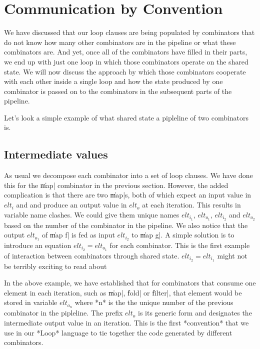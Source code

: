 \documentclass[preamble.tex]{subfiles}
\begin{document}
\section{Communication by Convention}

We have discussed that our loop clauses are being populated by combinators that do not know how many other combinators are in the pipeline or what these combinators are. And yet, once all of the combinators have filled in their parts, we end up with just one loop in which those combinators operate on the shared state. We will now discuss the approach by which those combinators cooperate with each other inside a single loop and how the state produced by one combinator is passed on to the combinators in the subsequent parts of the pipeline.

Let's look a simple example of what shared state a pipleline of two combinators  is.


\subsection{\label{sec:Loop:Elts}Intermediate values}

As usual we decompose each combinator into a set of loop clauses. We have done this for the \|map| combinator in the previous section. However, the added complication is that there are two \|map|s, both of which expect an input value in $elt_i$ and and produce an output value in $elt_o$ at each iteration. This results in variable name clashes. We could give them unique names $elt_{i_1}$, $elt_{o_1}$, $elt_{i_2}$ and $elt_{o_2}$ based on the number of the combinator in the pipeline. We also notice that the output $elt_{o_1}$ of \|map f| is fed as input $elt_{i_2}$ to \|map g|. A simple solution is to introduce an equation $elt_{i_2} = elt_{o_1}$ for each combinator. This is the first example of interaction between combinators through shared state.
 $elt_{i_2} = elt_{i_1}$ might not be terribly exciting to read about

In the above example, we have established that for combinators that consume one element in each iteration, such as \|map|, \|fold| or \|filter|, that element would be stored in variable $elt_{o_n}$ where *n* is the the unique number of the previous combinator in the pipleline. The prefix $elt_o$ is its generic form and designates the intermediate output value in an iteration. This is the first *convention* that we use in our *Loop* language to tie together the code generated by different combinators.
\end{document}
